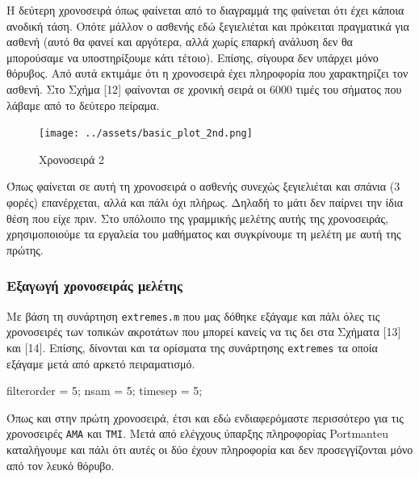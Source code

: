 \documentclass[11pt,]{article}
\newenvironment{Shaded}{}{}
\newcommand{\FloatTok}[1]{\textcolor[rgb]{0.25,0.63,0.44}{#1}}
\newcommand{\NormalTok}[1]{#1}
\begin{document}
Η δεύτερη χρονοσειρά όπως φαίνεται από το διαγραμμά της φαίνεται ότι
έχει κάποια ανοδική τάση. Οπότε μάλλον ο ασθενής εδώ ξεγιελιέται και
πρόκειται πραγματικά για ασθενή (αυτό θα φανεί και αργότερα, αλλά χωρίς
επαρκή ανάλυση δεν θα μπορούσαμε να υποστηρίξουμε κάτι τέτοιο). Επίσης,
σίγουρα δεν υπάρχει μόνο θόρυβος. Από αυτά εκτιμάμε ότι η χρονοσειρά
έχει πληροφορία που χαρακτηρίζει τον ασθενή. Στο Σχήμα {[}12{]}
φαίνονται σε χρονική σειρά οι 6000 τιμές του σήματος που λάβαμε από το
δεύτερο πείραμα.

\begin{figure}
\centering
\texttt{[image: ../assets/basic\_plot\_2nd.png]}
\caption{Χρονοσειρά 2}
\end{figure}

Όπως φαίνεται σε αυτή τη χρονοσειρά ο ασθενής συνεχώς ξεγιελιέται και
σπάνια (3 φορές) επανέρχεται, αλλά και πάλι όχι πλήρως. Δηλαδή το μάτι
δεν παίρνει την ίδια θέση που είχε πριν. Στο υπόλοιπο της γραμμικής
μελέτης αυτής της χρονοσειράς, χρησιμοποιούμε τα εργαλεία του μαθήματος
και συγκρίνουμε τη μελέτη με αυτή της πρώτης.

\hypertarget{ux3b5ux3beux3b1ux3b3ux3c9ux3b3ux3ae-ux3c7ux3c1ux3bfux3bdux3bfux3c3ux3b5ux3b9ux3c1ux3acux3c2-ux3bcux3b5ux3bbux3adux3c4ux3b7ux3c2-1}{%
\subsubsection{Εξαγωγή χρονοσειράς
μελέτης}\label{ux3b5ux3beux3b1ux3b3ux3c9ux3b3ux3ae-ux3c7ux3c1ux3bfux3bdux3bfux3c3ux3b5ux3b9ux3c1ux3acux3c2-ux3bcux3b5ux3bbux3adux3c4ux3b7ux3c2-1}}

Με βάση τη συνάρτηση \texttt{extremes.m} που μας δόθηκε εξάγαμε και πάλι
όλες τις χρονοσειρές των τοπικών ακροτάτων που μπορεί κανείς να τις δει
στα Σχήματα {[}13{]} και {[}14{]}. Επίσης, δίνονται και τα ορίσματα της
συνάρτησης \texttt{extremes} τα οποία εξάγαμε μετά από αρκετό
πειραματισμό.

\begin{Shaded}
\begin{Highlighting}[]
\NormalTok{filterorder = }\FloatTok{5}\NormalTok{;}
\NormalTok{nsam = }\FloatTok{5}\NormalTok{;}
\NormalTok{timesep = }\FloatTok{5}\NormalTok{;}
\end{Highlighting}
\end{Shaded}

Όπως και στην πρώτη χρονοσειρά, έτσι και εδώ ενδιαφερόμαστε περισσότερο
για τις χρονοσειρές \texttt{AMA} και \texttt{TMI}. Μετά από ελέγχους
ύπαρξης πληροφορίας Portmanteu καταλήγουμε και πάλι ότι αυτές οι δύο
έχουν πληροφορία και δεν προσεγγίζονται μόνο από τον λευκό θόρυβο.
\end{document}
